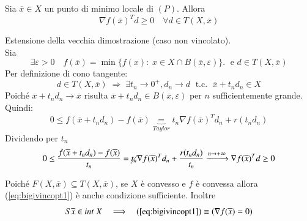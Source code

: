 \begin{theo}
Sia $\overline{x} \in X$ un punto di minimo locale di $(P)$. Allora
\begin{equation}
  \label{eq:bigivincopt1}
 \nabla f(\overline{x})^{T} d \geq 0 \quad
\forall d \in T(X, \overline{x})
\end{equation}
\end{theo}
\begin{thproof}
Estensione della vecchia dimostrazione (caso non vincolato). \\
Sia
$$ \exists \varepsilon > 0 \quad f(\overline{x}) =
\min\{f(x): \; x \in X \cap B(\overline{x}, \varepsilon) \}.
\; \text{ e } d \in T(X, \overline{x})$$
Per definizione di cono tangente:
$$ d \in T(X, \overline{x}) \; \Rightarrow \; \exists t_n \rightarrow 0^{+}, d_n \to d \; \text{ t.c. } \;
\overline{x} + t_n d_n \in X$$
Poich\'e
$\overline{x} + t_n d_n \rightarrow \overline{x}$ risulta
$\overline{x} + t_n d_n \in  B(\overline{x}, \varepsilon) $
per $n$ sufficientemente grande. Quindi:
$$ 0 \leq f(\overline{x} + t_n d_n) - f(\overline{x})
\underbrace{=}_{Taylor}  t_n \nabla f(\overline{x})^{T}d_n +
r(t_n d_n)
$$
Dividendo per $t_n$
$$ 0 \leq \dfrac{f(\overline{x} + t_n d_n) - f(\overline{x})}{t_n} =
\cancel{t_n }\nabla f(\overline{x})^{T}d_n +
\dfrac{r(t_n d_n)}{t_n} \xrightarrow{n \to + \infty} \nabla f(\overline{x})^{T}d \geq 0
$$
\end{thproof}

\begin{observation}
Poich\'e $F(X, \overline{x})\subseteq T(X, \overline{x})$,
se $X$ \`e convesso e $f$ \`e convessa allora
(\ref{eq:bigivincopt1}) \`e anche condizione sufficiente.
Inoltre 
$$S
\overline{x} \in int\; X \quad
\Longrightarrow \quad (  \ref{eq:bigivincopt1})
 \equiv (\nabla f(\overline{x}) = 0)$$
\end{observation}

